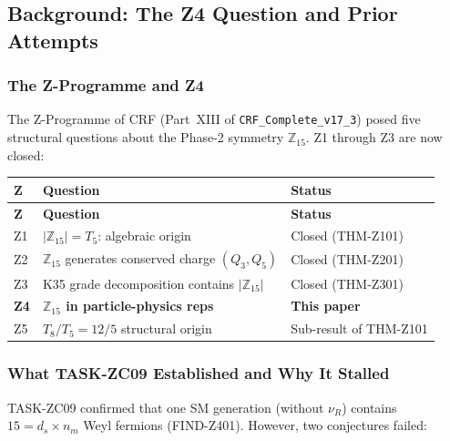 \documentclass[12pt, a4paper]{article}
\begin{document}
\subsection{Background: The Z4 Question and Prior Attempts}
\label{sec:background}

\subsubsection{The Z-Programme and Z4}

The Z-Programme of CRF (Part~XIII of \texttt{CRF\_Complete\_v17\_3})
posed five structural questions about the Phase-2 symmetry
$\mathbb{Z}_{15}$.  Z1 through Z3 are now closed:

{\small
\setlength{\LTpre}{4pt}
\setlength{\LTpost}{4pt}
\renewcommand{\arraystretch}{1.30}
\begin{longtable}{>{\centering\arraybackslash}p{0.8cm}
                  >{\raggedright\arraybackslash}p{7.5cm}
                  >{\centering\arraybackslash}p{3.5cm}}
\toprule
\textbf{Z} & \textbf{Question} & \textbf{Status}\\
\midrule
\endfirsthead
\toprule
\textbf{Z} & \textbf{Question} & \textbf{Status}\\
\midrule
\endhead
\bottomrule
\endlastfoot
Z1 & $|\mathbb{Z}_{15}| = T_5$: algebraic origin
  & Closed (THM-Z101) \\
Z2 & $\mathbb{Z}_{15}$ generates conserved charge $(Q_3,Q_5)$
  & Closed (THM-Z201) \\
Z3 & K35 grade decomposition contains $|\mathbb{Z}_{15}|$
  & Closed (THM-Z301) \\
\textbf{Z4} & \textbf{$\mathbb{Z}_{15}$ in particle-physics reps}
  & \textbf{This paper} \\
Z5 & $T_8/T_5 = 12/5$ structural origin
  & Sub-result of THM-Z101 \\
\end{longtable}
}

\subsubsection{What TASK-ZC09 Established and Why It Stalled}

TASK-ZC09 confirmed that one SM generation (without $\nu_R$)
contains $15 = d_s \times n_m$ Weyl fermions (FIND-Z401).
However, two conjectures failed:
\end{document}
